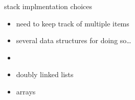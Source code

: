 \begin{frame}{stack implmentation choices}
\begin{itemize}
\item need to keep track of multiple items
\item several data structures for doing so\ldots
\vspace{.5cm}
\item {}
\item doubly linked lists
\item arrays
\end{itemize}
\end{frame}

\makeatletter
{}
\makeatother

